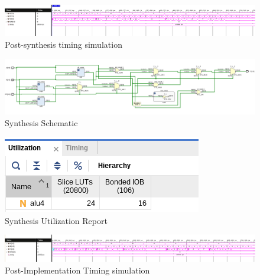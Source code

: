 \documentclass[CMPE]{../KGCOEReport}
\begin{document}
    \begin{figure}[h!]
        \centering
        \includegraphics[width=\textwidth]{img/post_synthesis_time_4}
        \caption{Post-synthesis timing simulation}
        \label{fig:demo2}
    \end{figure}
    \begin{figure}[h!]
        \centering
        \includegraphics[width=\textwidth]{img/rtl_4_schem}
        \caption{Synthesis Schematic}
        \label{fig:demo3}
    \end{figure}
    \begin{figure}[h!]
        \centering
        \includegraphics[width=\textwidth]{img/util_4}
        \caption{Synthesis Utilization Report}
        \label{fig:demo4}
    \end{figure}
    \begin{figure}[h!]
        \centering
        \includegraphics[width=\textwidth]{img/timing_4}
        \caption{Post-Implementation Timing simulation}
        \label{fig:demo5}
    \end{figure}
\end{document}
